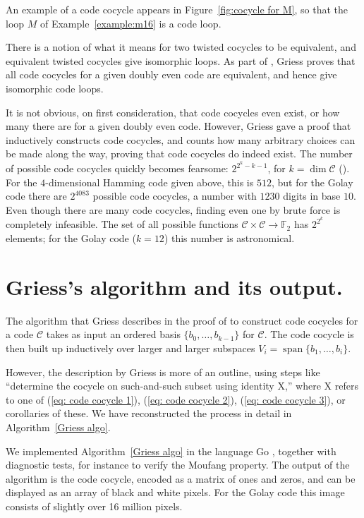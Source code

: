 \documentclass{article}
\theoremstyle{plain}
\theoremstyle{definition}
\def \cC {\mathcal{C}}
\def \FF {\mathbb{F}}
\DeclareMathOperator{\Span}{span}
\begin{document}
An example of a code cocycle appears in Figure~\ref{fig:cocycle for M}, so that the loop $M$ of Example~\ref{example:m16} is a code loop.

There is a notion of what it means for two twisted cocycles to be equivalent, and equivalent twisted cocycles give isomorphic loops.
As part of \cite[Theorem 10]{Griess}, Griess proves that all code cocycles for a given doubly even code are equivalent, and hence give isomorphic code loops. 

It is not obvious, on first consideration, that code cocycles even exist, or how many there are for a given doubly even code. 
However, Griess gave a proof that inductively constructs code cocycles, and counts how many arbitrary choices can be made along the way, proving that code cocycles do indeed exist.
The number of possible code cocycles quickly becomes fearsome: $2^{2^k-k-1}$, for $k=\dim \cC$ (\cite[Theorem 10]{Griess}).
For the $4$-dimensional Hamming code given above, this is $512$, but for the Golay code there are $2^{4083}$ possible code cocycles, a number with $1230$ digits in base $10$.
Even though there are many code cocycles, finding even one by brute force is completely infeasible.
The set of all possible functions $\cC\times \cC \to \FF_2$ has $2^{2^k}$ elements; for the Golay code ($k=12$) this number is astronomical.




\section{Griess's algorithm and its output.}

The algorithm that Griess describes in the proof of \cite[Theorem 10]{Griess} to construct code cocycles for a code $\cC$ takes as input an ordered  basis $\{b_0,\ldots,b_{k-1}\}$ for $\cC$. 
The code cocycle is then built up inductively over larger and larger subspaces $V_i = \Span\{b_1,\ldots,b_i\}$.%

However, the description by Griess is more of an outline, using steps like ``determine the cocycle on such-and-such subset using identity X,'' where X refers to one of (\ref{eq: code cocycle 1}), (\ref{eq: code cocycle 2}), (\ref{eq: code cocycle 3}), or corollaries of these. We have reconstructed the process in detail in Algorithm~\ref{Griess algo}.


We implemented Algorithm~\ref{Griess algo} in the language Go \cite{RN_GH}, together with diagnostic tests, for instance to verify the Moufang property.
The output of the algorithm is the code cocycle, encoded as a matrix of ones and zeros, and can be displayed as an array of black and white pixels.
For the Golay code this image consists of slightly over 16 million pixels.
\end{document}
